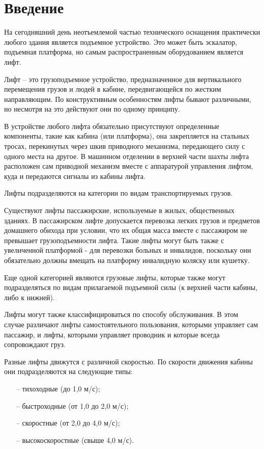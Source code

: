\chapter*{Введение}
	На сегодняшний день неотъемлемой частью технического оснащения практически любого здания
		является подъемное устройство. Это может быть эскалатор, подъемная платформа,
		но самым распространенным оборудованием является лифт.

	Лифт -- это грузоподъемное устройство, предназначенное для вертикального перемещения
		грузов и людей в кабине, передвигающейся по жестким направляющим.
		По конструктивным особенностям лифты бывают различными, но несмотря на это действуют они по одному принципу.

	В устройстве любого лифта обязательно присутствуют определенные компоненты,
		такие как кабина (или платформа), она закрепляется на стальных тросах,
		перекинутых через шкив приводного механизма, передающего силу с одного места на другое.
		В машинном отделении в верхней части шахты лифта расположен сам приводной механизм
		вместе с аппаратурой управления лифтом, куда и передаются сигналы из кабины лифта. 

	Лифты подразделяются на категории по видам транспортируемых грузов.

	Существуют лифты пассажирские, используемые в жилых, общественных зданиях.
		В пассажирском лифте допускается перевозка легких грузов и предметов домашнего обихода при условии,
		что их общая масса вместе с пассажиром не превышает грузоподъемности лифта.
		Такие лифты могут быть также с увеличенной платформой - для перевозки больных и инвалидов,
		поскольку они обязательно должны вмещать на платформу инвалидную коляску или кушетку.

	Еще одной категорией являются грузовые лифты, которые также могут подразделяться
		по видам прилагаемой подъемной силы (к верхней части кабины, либо к нижней).

	Лифты могут также классифицироваться по способу обслуживания.
		В этом случае различают лифты самостоятельного пользования,
		которыми управляет сам пассажир, и лифты, которыми управляет проводник и которые всегда сопровождают груз.

	Разные лифты движутся с различной скоростью. По скорости движения кабины они подразделяются на следующие типы:
		\begin{itemize}
			\changefontsizes[14pt]{14pt}
			\item[--] тихо­ходные (до 1,0 м/с);
			\item[--] быстроходные (от 1,0 до 2,0 м/с);
			\item[--] скоростные (от 2,0 до 4,0 м/с);
			\item[--] высокоскоростные (свыше 4,0 м/с).
			\vspace{-14pt}
		\end{itemize}

